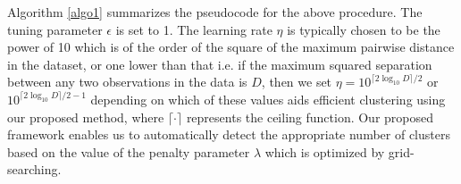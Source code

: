 \documentclass{article}
\begin{document}
Algorithm \ref{algo1} summarizes the pseudocode for the above procedure. The tuning parameter $\epsilon$ is set to 1. The learning rate $\eta$ is typically chosen to be the power of 10 which is of the order of the square of the maximum pairwise distance in the dataset, or one lower than that i.e. if the maximum squared separation between any two observations in the data is $D$, then we set $\eta = 10 ^{\lceil 2\log_{10} D \rceil /2}$ or $10^{\lceil 2\log_{10} D \rceil /2-1}$ depending on which of these values aids efficient clustering using our proposed method, where $\lceil \cdot \rceil$ represents the ceiling function. Our proposed framework enables us to automatically detect the appropriate number of clusters based on the value of the penalty parameter $\lambda$ which is optimized by grid-searching.

\end{document}
